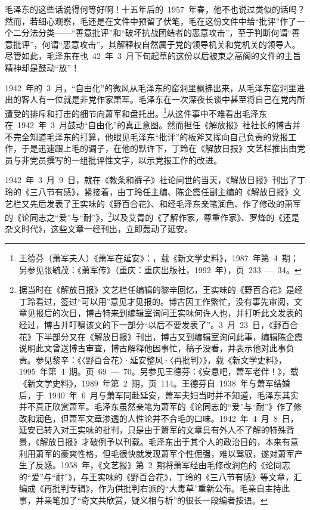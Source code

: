 毛泽东的这些话说得何等好啊！十五年后的~1957~年春，他不也说过类似的话吗？然而，若细心观察，毛还是在文件中预留了伏笔，毛在这份文件中给“批评”作了一个二分法分类——“善意批评”和“破坏抗战团结者的恶意攻击”，至于判断何谓“善意批评”，何谓“恶意攻击”，其解释权自然属于党的领导机关和党机关的领导人。尽管如此，毛泽东在也~42~年~3~月下旬起草的这份以后被束之高阁的文件的主旨精神却是鼓动“放”！

1942~年的~3~月，“自由化”的微风从毛泽东的窑洞里飘拂出来，从毛泽东窑洞里进出的客人有一位就是非党作家萧军。毛泽东在一次深夜长谈中甚至将自己在党内所遭受的排斥和打击的细节向萧军和盘托出。\footnote{王德芬（萧军夫人）《萧军在延安》：，载《新文学史料》，1987~年第~4~期；另参见张毓茂：《萧军传》（重庆：重庆出版社，1992~年），页~233~—~34。}从这件事中不难看出毛泽东在~1942~年~3~月鼓动“自由化”的真正意图。然而担任《解放报》社社长的博古并不完全知道毛泽东的打算，他眼见毛泽东“批评”的板斧又挥向自己负责的党报工作，于是迅速跟上毛的调子，在他的默许下，丁玲在《解放日报》文艺栏推出由党员与非党员撰写的一组批评性文字，以示党报工作的改进。

1942~年~3~月~9~日，就在《教条和裤子》社论问世的当天，《解放日报》刊出了丁玲的《三八节有感》，紧接着，由丁玲任主编、陈企霞任副主编的《解放日报》文艺栏又先后发表了王实味的《野百合花》、和经毛泽东亲笔润色、作了修改的萧军的《论同志之“爱”与“耐”》，\footnote{据当时在《解放日报》文艺栏任编辑的黎辛回忆，王实味的《野百合花》是经丁玲看过，签过“可以用”意见才见报的。博古因工作繁忙，没有事先审阅，文章见报后的次日，博古特来到编辑室询问王实味何许人也，并打听此文发表的经过，博古并叮嘱该文的下一部分“以后不要发表了”。3~月~23~日，《野百合花》下半部分又在《解放日报》刊出，博古又到编辑室询问此事，编辑陈企霞说明此文曾送博古审查，博古解释他因事忙，稿子没看，并表示他对此事负责。参见黎辛：《〈野百合花〉·延安整风·〈再批判〉》，载《新文学史料》，1995~年第~4~期。页~69~—~70。另参见王德芬：《安息吧，萧军老伴！》，载《新文学史料》，1989~年第~2~期，页~114。王德芬自~1938~年与萧军结婚后，于~1940~年~6~月与萧军同赴延安，萧军夫妇当时并不知道，毛泽东其实并不真正欣赏萧军。毛泽东虽然亲笔为萧军的《论同志的“爱”与“耐”》作了修改和润色，但萧军文章渗透的人性论并不合毛的口味。1942~年~4~月~8~日，延安已转入对王实味的批判，只是由于箫军的文章具有外人不了解的特殊背景，《解放日报》才破例予以刊载。毛泽东出于其个人的政治目的，本来有意利用萧军的豪爽性格，但毛很快就发现萧军个性倔强，难以驾驭，遂对萧军产生了反感。1958~年，《文艺报》第~2~期将萧军经由毛修改润色的《论同志的“爱”与“耐”》，与王实味的《野百合花》，丁玲的《三八节有感》等文章，汇编成《再批判专辑》，作为供批判右派的“大毒草”重新公布。毛亲自主持此事，并亲笔加了“奇文共欣赏，疑义相与析”的很长一段编者按语。}以及艾青的《了解作家，尊重作家》、罗烽的《还是杂文时代》，这些文章一经刊出，立即轰动了延安。

